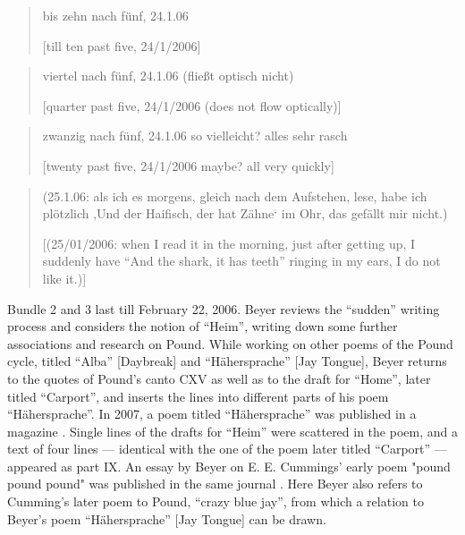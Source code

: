 \begin{paper}
\begin{quote}
bis zehn nach fünf, 24.1.06

\vspace{1em}

[till ten past five, 24/1/2006]
\end{quote}

\begin{quote}
viertel nach fünf, 24.1.06 (fließt optisch nicht)

\vspace{1em}

[quarter past five, 24/1/2006 (does not flow optically)]
\end{quote}

\begin{quote}
zwanzig nach fünf, 24.1.06 so vielleicht? alles sehr rasch

\vspace{1em}

[twenty past five, 24/1/2006 maybe? all very quickly]
\end{quote}

\begin{quote}
(25.1.06: als ich es morgens, gleich nach dem Aufstehen, lese, habe ich
plötzlich ‚Und der Haifisch, der hat Zähne` im Ohr, das gefällt mir
nicht.)

\vspace{1em}

[(25/01/2006: when I read it in the morning, just after getting up,
I suddenly have ``And the shark, it has teeth'' ringing in my ears, I do
not like it.)]
\end{quote}

Bundle 2 and 3 last till February 22, 2006. Beyer reviews the ``sudden''
writing process and considers the notion of ``Heim'', writing down some
further associations and research on Pound. While working on other poems
of the Pound cycle, titled ``Alba'' [Daybreak] and ``Hähersprache'' [Jay
Tongue], Beyer returns to the quotes of Pound's canto CXV as well as to
the draft for ``Home'', later titled ``Carport'', and inserts the lines
into different parts of his poem ``Hähersprache''. In 2007, a poem
titled ``Hähersprache'' was published in a magazine \parencite{beyer_hahersprache_2007}.
Single lines of the drafts for ``Heim'' were scattered in the poem, and
a text of four lines –– identical with the one of the poem later titled
``Carport'' –– appeared as part IX. An essay by Beyer on E. E. Cummings'
early poem "pound pound pound" was published in the same journal \citep{beyer_zu_2007}. Here Beyer also refers to Cumming's later poem to Pound,
``crazy blue jay'', from which a relation to Beyer's poem
``Hähersprache'' [Jay Tongue] can be drawn.


\end{paper}
